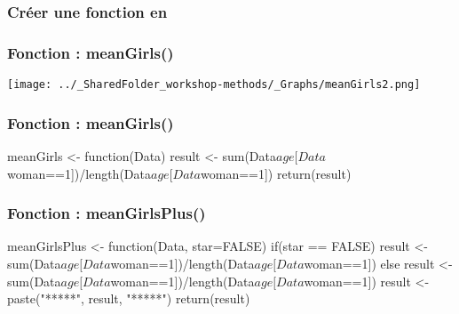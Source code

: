 \documentclass{beamer}
\begin{document}

    \begin{frame}[fragile=singleslide]
        \frametitle{Créer une fonction en \R}
    \end{frame}
    
    \begin{frame}
        \frametitle{Fonction \R : meanGirls()} \vspace{1cm}
        \begin{center}
            \texttt{[image: ../\_SharedFolder\_workshop-methods/\_Graphs/meanGirls2.png]}
        \end{center}
    \end{frame}
    
    \begin{frame}[fragile=singleslide]
        \frametitle{Fonction \R: meanGirls()}
        \begin{code}
meanGirls <- function(Data){
    result <- sum(Data$age[Data$woman==1])/length(Data$age[Data$woman==1])
    return(result)
}
        \end{code}
    \end{frame}


    \begin{frame}[fragile=singleslide]
        \frametitle{Fonction \R : meanGirlsPlus()}
        \begin{code}
meanGirlsPlus <- function(Data, star=FALSE){
    if(star == FALSE){
        result <- sum(Data$age[Data$woman==1])/length(Data$age[Data$woman==1])
    } else {
        result <- sum(Data$age[Data$woman==1])/length(Data$age[Data$woman==1])
        result <- paste("*****", result, "*****")
    }    
    return(result)
}
        \end{code}
    \end{frame}
    
\end{document}
